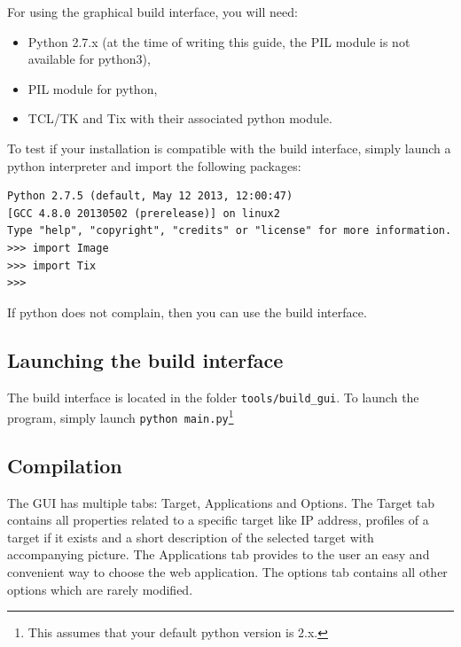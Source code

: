 \documentclass{report}
\begin{document}
For using the graphical build interface, you will need:
\begin{itemize}
\item Python 2.7.x (at the time of writing this guide, the PIL module is not available for python3),
\item PIL module for python,
\item TCL/TK and Tix with their associated python module.
\end{itemize}

To test if your installation is compatible with the build interface, simply
launch a python interpreter and import the following packages:

\begin{verbatim}
Python 2.7.5 (default, May 12 2013, 12:00:47) 
[GCC 4.8.0 20130502 (prerelease)] on linux2
Type "help", "copyright", "credits" or "license" for more information.
>>> import Image
>>> import Tix
>>> 
\end{verbatim}

If python does not complain, then you can use the build interface.

\subsection{Launching the build interface}

The build interface is located in the folder \verb!tools/build_gui!. To launch
the program, simply launch \verb!python main.py!\footnote{This assumes that
  your default python version is 2.x.}

\subsection{Compilation}
The GUI has multiple tabs: Target, Applications and Options.  The Target tab
contains all properties related to a specific target like IP address, profiles
of a target if it exists and a short description of the selected target with
accompanying picture.  The Applications tab provides to the user an easy and
convenient way to choose the web application.  The options tab contains all
other options which are rarely modified.  \medskip
\end{document}
